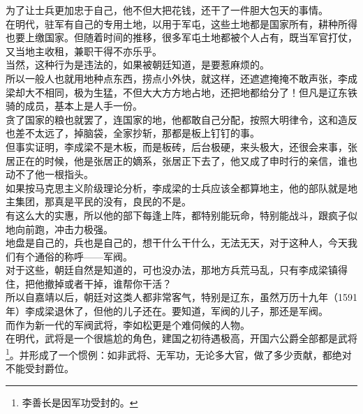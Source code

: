 \begin{multicols}{\theparacolNo}
为了让士兵更加忠于自己，他不但大把花钱，还干了一件胆大包天的事情。\\

在明代，驻军有自己的专用土地，以用于军屯，这些土地都是国家所有，耕种所得也要上缴国家。但随着时间的推移，很多军屯土地都被个人占有，既当军官打仗，又当地主收租，兼职干得不亦乐乎。\\

当然，这种行为是违法的，如果被朝廷知道，是要惹麻烦的。\\

所以一般人也就用地种点东西，捞点小外快，就这样，还遮遮掩掩不敢声张，李成梁却大不相同，极为生猛，不但大大方方地占地，还把地都给分了！但凡是辽东铁骑的成员，基本上是人手一份。\\

贪了国家的粮也就罢了，连国家的地，他都敢自己分配，按照大明律令，这和造反也差不太远了，掉脑袋，全家抄斩，那都是板上钉钉的事。\\

但事实证明，李成梁不是木板，而是板砖，后台极硬，来头极大，还很会来事，张居正在的时候，他是张居正的嫡系，张居正下去了，他又成了申时行的亲信，谁也动不了他一根指头。\\

如果按马克思主义阶级理论分析，李成梁的士兵应该全都算地主，他的部队就是地主集团，那真是平民的没有，良民的不是。\\

有这么大的实惠，所以他的部下每逢上阵，都特别能玩命，特别能战斗，跟疯子似地向前跑，冲击力极强。\\

地盘是自己的，兵也是自己的，想干什么干什么，无法无天，对于这种人，今天我们有个通俗的称呼——军阀。\\

对于这些，朝廷自然是知道的，可也没办法，那地方兵荒马乱，只有李成梁镇得住，把他撤掉或者干掉，谁帮你干活？\\

所以自嘉靖以后，朝廷对这类人都非常客气，特别是辽东，虽然万历十九年（1591年）李成梁退休了，但他的儿子还在。要知道，军阀的儿子，那还是军阀。\\

而作为新一代的军阀武将，李如松更是个难伺候的人物。\\

在明代，武将是一个很尴尬的角色，建国之初待遇极高，开国六公爵全部都是武将\footnote{李善长是因军功受封的。}。并形成了一个惯例：如非武将、无军功，无论多大官，做了多少贡献，都绝对不能受封爵位。\\


\end{multicols}

